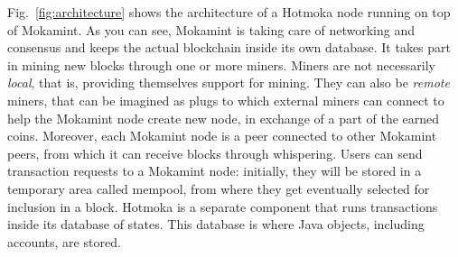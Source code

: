 Fig.~\ref{fig:architecture} shows the architecture of a Hotmoka node running on top of Mokamint.
As you can see, Mokamint is taking care of networking and consensus and keeps the actual blockchain
inside its own database. It takes part in mining new blocks through one or more miners.
Miners are not necessarily \emph{local}, that is, providing themselves support for mining. They can also
be \emph{remote} miners, that can be imagined as plugs to which external miners can connect to help
the Mokamint node create new node, in exchange of a part of the earned coins.
Moreover, each Mokamint node is a peer connected to other Mokamint peers, from which it can receive blocks through
whispering. Users can send transaction requests to a Mokamint node: initially, they will be stored
in a temporary area called mempool, from where they get eventually selected for inclusion in a block.
Hotmoka is a separate component that runs transactions inside its database of states. This database
is where Java objects, including accounts, are stored.

